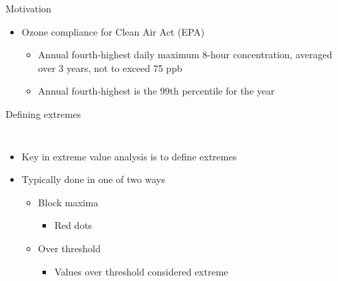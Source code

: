 \documentclass{beamer}
\begin{document}
\begin{frame}{Motivation}
  \begin{itemize} \setlength{\itemsep}{0.5em}
    \item Ozone compliance for Clean Air Act (EPA)
    \begin{itemize}
      \item Annual fourth-highest daily maximum 8-hour concentration, averaged over 3 years, not to exceed 75 ppb
      \item Annual fourth-highest is the 99th percentile for the year
    \end{itemize}
  \end{itemize}
\end{frame}

\begin{frame}{Defining extremes}
\begin{columns}[c]
  \begin{itemize} \setlength{\itemsep}{0.5em}
    \item Key in extreme value analysis is to define extremes
    \item Typically done in one of two ways
    \begin{itemize}
      \item Block maxima
      \begin{itemize}
        \item Red dots
      \end{itemize}
      \item Over threshold
      \begin{itemize}
        \item Values over threshold considered extreme
      \end{itemize}
    \end{itemize}
  \end{itemize}


\end{columns}
\end{frame}
\end{document}
